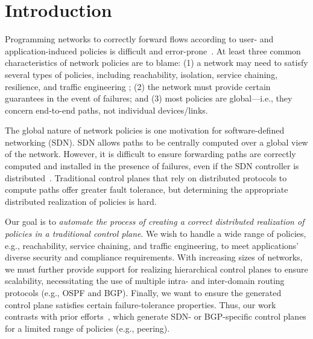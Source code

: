 \section{Introduction}
Programming networks to correctly forward flows according to user- and
application-induced policies is difficult and
error-prone~\cite{troubleshooting, bgpmisconfig}. At least three
common characteristics of network policies are to blame: (1) a network
may need to satisfy several types of policies, including reachability,
isolation, service chaining, resilience, and traffic engineering ; (2)
the network must provide certain guarantees in the event of failures;
and (3) most policies are global---i.e., they concern end-to-end
paths, not individual devices/links.


The global nature of network policies is one motivation for
software-defined networking (SDN). SDN allows paths to be centrally
computed over a global view of the network. However, it is difficult
to ensure forwarding paths are correctly computed and installed in the
presence of failures, even if the SDN controller is
distributed~\cite{hasdn}.  Traditional control planes that rely on
distributed protocols to compute paths offer greater fault tolerance,
but determining the appropriate distributed realization of policies is
hard.




Our goal is to {\em automate the process of creating a correct
  distributed realization of policies in a traditional control
  plane}. We wish to handle a wide range of policies, e.g.,
reachability, service chaining, and traffic engineering, to meet
applications' diverse security and compliance requirements. With
increasing sizes of networks, we must further provide support for
realizing hierarchical control planes to ensure scalability,
necessitating the use of multiple intra- and inter-domain routing
protocols (e.g., OSPF and BGP). Finally, we want to ensure the
generated control plane satisfies certain failure-tolerance
properties. Thus, our work contrasts with prior efforts~\cite{netegg,
  propane, merlin,simple,fattire, netkat, netkatcompiler, sol}, which
generate SDN- or BGP-specific control planes for a limited range of
policies (e.g., peering).

